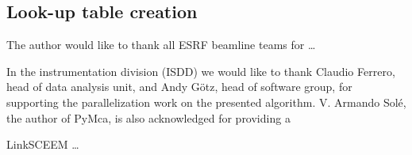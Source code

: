 \documentclass[preprint]{iucr}
\begin{document}
\subsection{Look-up table creation}



The author would like to thank all ESRF beamline teams for \ldots

In the instrumentation division (ISDD) we would like to thank Claudio Ferrero,
head of data analysis unit, and Andy G\"otz, head of software group, for
supporting the parallelization work on the presented algorithm.
V. Armando Solé, the author of PyMca, is also acknowledged for providing a

LinkSCEEM \ldots
\end{document}
